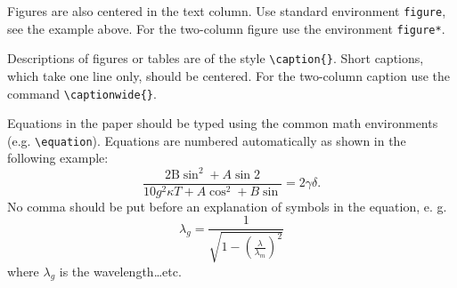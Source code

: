 \documentclass{poster15}
\begin{document}
Figures are also centered in the text column. Use standard environment \verb+figure+, see the example above. For the two-column figure use the environment \verb+figure*+. 

Descriptions of figures or tables are of the style \verb+\caption{}+. Short captions, which take one line only, should be centered. For the two-column caption use the command \verb+\captionwide{}+.

Equations in the paper should be typed using the common math  environments (e.g. \verb+\equation+). Equations are numbered automatically as shown in the following example:
\begin{equation}
\frac{2\mathrm{B} \sin^2 + A \sin2}{10 g^2 \kappa T + A \cos^2 + B \sin}= 2 \gamma\delta .
\end{equation}
No comma should be put before an explanation of symbols in the equation, e. g. 
\begin{equation}
       \lambda_g =\frac{1}{\sqrt{1-\left(\frac{\lambda}{\lambda_m}\right)^2}}
\end{equation}	
where $\lambda_g$ is the wavelength\dots etc.
\end{document}
